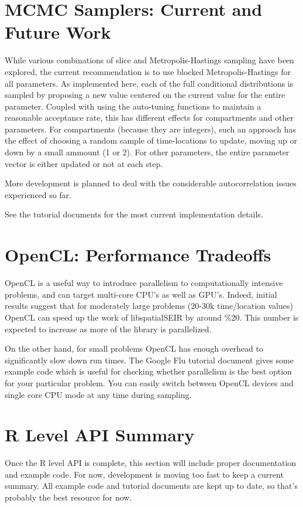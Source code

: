 \documentclass[12pt]{article}
\begin{document}
\section{MCMC Samplers: Current and Future Work}

While various combinations of slice and Metropolis-Hastings sampling have been explored, the current recommendation is to 
use blocked Metropolis-Hastings for all parameters. As implemented here, each of the full conditional distributions is sampled
by proposing a new value centered on the current value for the entire parameter. Coupled with using the auto-tuning functions to 
maintain a reasonable acceptance rate, this has different effects for compartments and other parameters. For compartments (because
they are integers), such an approach has the effect of choosing a random sample of time-locations to update, moving up or down by 
a small ammount (1 or 2). For other parameters, the entire parameter vector is either updated or not at each step.  

More development is planned to deal with the considerable autocorrelation issues experienced so far. 

See the tutorial documents for the most current implementation details. 

\section{OpenCL: Performance Tradeoffs}

OpenCL is a useful way to introduce parallelism to computationally intensive problems, and can target multi-core CPU's as well as
GPU's. Indeed, initial results suggest that for moderately large problems (20-30k time/location values) OpenCL can speed up the 
work of libspatialSEIR by around \%20. This number is expected to increase as more of the library is parallelized. 

On the other hand, for small problems OpenCL has enough overhead to significantly slow down run times. The Google Flu tutorial document 
gives some example code which is useful for checking whether parallelism is the best option for your particular problem. You can easily 
switch between OpenCL devices and single core CPU mode at any time during sampling. 

\section{R Level API Summary}

Once the R level API is complete, this section will include proper documentation and example code. For now, development is moving too fast
to keep a current summary. All example code and tutorial documents are kept up to date, so that's probably the best resource for now. 
\end{document}
